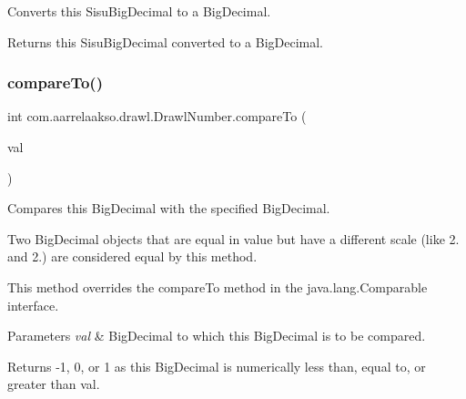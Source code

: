 Converts this Sisu\+Big\+Decimal to a Big\+Decimal. 

\begin{DoxyReturn}{Returns}
this Sisu\+Big\+Decimal converted to a Big\+Decimal. 
\end{DoxyReturn}
\mbox{\label{classcom_1_1aarrelaakso_1_1drawl_1_1_drawl_number_a6bab13fc3993e590f3b4f0198b0c8ee4}} 
\subsubsection{\texorpdfstring{compare\+To()}{compareTo()}}
{\footnotesize\ttfamily int com.\+aarrelaakso.\+drawl.\+Drawl\+Number.\+compare\+To (\begin{DoxyParamCaption}\item[{@Not\+Null \hyperlink{classcom_1_1aarrelaakso_1_1drawl_1_1_drawl_number}{Drawl\+Number}}]{val }\end{DoxyParamCaption})}



Compares this Big\+Decimal with the specified Big\+Decimal. 

Two Big\+Decimal objects that are equal in value but have a different scale (like 2. and 2.) are considered equal by this method. 

This method overrides the compare\+To method in the java.\+lang.\+Comparable interface.


\begin{DoxyParams}{Parameters}
{\em val} & Big\+Decimal to which this Big\+Decimal is to be compared. \\
\hline
\end{DoxyParams}
\begin{DoxyReturn}{Returns}
-\/1, 0, or 1 as this Big\+Decimal is numerically less than, equal to, or greater than val. 
\end{DoxyReturn}
\mbox{\label{classcom_1_1aarrelaakso_1_1drawl_1_1_drawl_number_a3d2e5dfb0be1738bf114eefd27692a4a}} 
